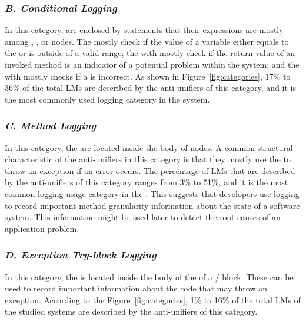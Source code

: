 
\subsubsection{\emph{B. Conditional Logging}}  \label{conditional logging}
In this category,  are enclosed by  statements that their expressions are mostly among  ,  , or   nodes. The   mostly check if the value of a variable either equals to the   or is outside of a valid range; the   with   mostly check if the return value of an invoked method is an indicator of a potential problem within the system; and the   with  mostly checks if a   is incorrect. As shown in Figure~\ref{fig:categories}, 17\% to 36\% of the total LMs are described by the anti-unifiers of this category, and it is the most commonly used logging category in the  system.

\subsubsection{\emph{C. Method Logging}}  \label{method logging}
In this category, the  are located inside the body of  nodes. A common structural characteristic of the anti-unifiers in this category is that they mostly use the  to throw an exception if an error occurs. The percentage of LMs that are described by the anti-unifiers of this category ranges from 3\% to 51\%, and it is the most common logging usage category in the . This suggests that developers use logging to record important method granularity information about the state of a software system. This information might be used later to  detect the root causes of an application problem.

\subsubsection{\emph{D. Exception Try-block Logging}}  \label{Exception try-block logging}
In this category, the  is located inside the body of the   of a / block. These  can be used to record important information about the code that may throw an exception. According to the Figure~\ref{fig:categories}, 1\% to 16\% of the total LMs of the studied systems are described by the anti-unifiers of this category. 


